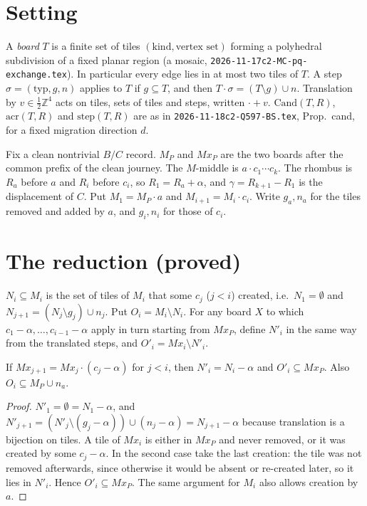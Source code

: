 \section{Setting}\label{sec:set}
A \emph{board} $T$ is a finite set of tiles $(\mathrm{kind},\text{vertex set})$ forming a polyhedral subdivision of a fixed planar region (a mosaic, \texttt{2026-11-17c2-MC-pq-exchange.tex}). In particular every edge lies in at most two tiles of $T$.
A step $\sigma=(\mathrm{typ},g,n)$ applies to $T$ if $g\subseteq T$, and then $T\cdot\sigma=(T\setminus g)\cup n$. Translation by $v\in\tfrac12\mathbb Z^4$ acts on tiles, sets of tiles and steps, written $\cdot+v$.
$\mathrm{Cand}(T,R)$, $\mathrm{acr}(T,R)$ and $\mathrm{step}(T,R)$ are as in \texttt{2026-11-18c2-Q597-BS.tex}, Prop.~cand, for a fixed migration direction $d$.

Fix a clean nontrivial $B/C$ record. $M_P$ and $Mx_P$ are the two boards after the common prefix of the clean journey. The $M$-middle is $a\cdot c_1\cdots c_k$. The rhombus is $R_a$ before $a$ and $R_i$ before $c_i$, so $R_1=R_a+\alpha$, and $\gamma=R_{k+1}-R_1$ is the displacement of $C$.
Put $M_1=M_P\cdot a$ and $M_{i+1}=M_i\cdot c_i$. Write $g_a,n_a$ for the tiles removed and added by $a$, and $g_i,n_i$ for those of $c_i$.

\section{The reduction (proved)}\label{sec:red}
\begin{definition}
$N_i\subseteq M_i$ is the set of tiles of $M_i$ that some $c_j$ ($j<i$) created, i.e.\ $N_1=\emptyset$ and $N_{j+1}=(N_j\setminus g_j)\cup n_j$. Put $O_i=M_i\setminus N_i$. For any board $X$ to which $c_1-\alpha,\dots,c_{i-1}-\alpha$ apply in turn starting from $Mx_P$, define $N'_i$ in the same way from the translated steps, and $O'_i=Mx_i\setminus N'_i$.
\end{definition}

\begin{lemma}\label{lem:hist}
If $Mx_{j+1}=Mx_j\cdot(c_j-\alpha)$ for $j<i$, then $N'_i=N_i-\alpha$ and $O'_i\subseteq Mx_P$. Also $O_i\subseteq M_P\cup n_a$.
\end{lemma}
\begin{proof}
$N'_1=\emptyset=N_1-\alpha$, and $N'_{j+1}=(N'_j\setminus(g_j-\alpha))\cup(n_j-\alpha)=N_{j+1}-\alpha$ because translation is a bijection on tiles.
A tile of $Mx_i$ is either in $Mx_P$ and never removed, or it was created by some $c_j-\alpha$. In the second case take the last creation: the tile was not removed afterwards, since otherwise it would be absent or re-created later, so it lies in $N'_i$. Hence $O'_i\subseteq Mx_P$. The same argument for $M_i$ also allows creation by $a$.
\end{proof}

